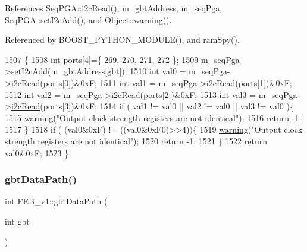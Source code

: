 References Seq\+P\+G\+A\+::i2c\+Read(), m\+\_\+gbt\+Address, m\+\_\+seq\+Pga, Seq\+P\+G\+A\+::set\+I2c\+Add(), and Object\+::warning().



Referenced by B\+O\+O\+S\+T\+\_\+\+P\+Y\+T\+H\+O\+N\+\_\+\+M\+O\+D\+U\+L\+E(), and ram\+Spy().


\begin{DoxyCode}
1507                                    \{
1508   \textcolor{keywordtype}{int} ports[4]=\{ 269, 270, 271, 272 \};
1509   \hyperlink{classFEB__v1_a6c7804ac86796f233a8393043adf2e77}{m\_seqPga}->\hyperlink{classSeqPGA_a4ef334e4d2cb417b49033dce951728cd}{setI2cAdd}(\hyperlink{classFEB__v1_ac625855df976f16694178f1a4c0eef1e}{m\_gbtAddress}[gbt]);
1510   \textcolor{keywordtype}{int} val0 = \hyperlink{classFEB__v1_a6c7804ac86796f233a8393043adf2e77}{m\_seqPga}->\hyperlink{classSeqPGA_a7cd344df2be99f3a02b487f80e87b27e}{i2cRead}(ports[0])&0xF; 
1511   \textcolor{keywordtype}{int} val1 = \hyperlink{classFEB__v1_a6c7804ac86796f233a8393043adf2e77}{m\_seqPga}->\hyperlink{classSeqPGA_a7cd344df2be99f3a02b487f80e87b27e}{i2cRead}(ports[1])&0xF; 
1512   \textcolor{keywordtype}{int} val2 = \hyperlink{classFEB__v1_a6c7804ac86796f233a8393043adf2e77}{m\_seqPga}->\hyperlink{classSeqPGA_a7cd344df2be99f3a02b487f80e87b27e}{i2cRead}(ports[2])&0xF; 
1513   \textcolor{keywordtype}{int} val3 = \hyperlink{classFEB__v1_a6c7804ac86796f233a8393043adf2e77}{m\_seqPga}->\hyperlink{classSeqPGA_a7cd344df2be99f3a02b487f80e87b27e}{i2cRead}(ports[3])&0xF; 
1514   \textcolor{keywordflow}{if} ( val1 != val0 || val2 != val0 || val3 != val0 )\{
1515       \hyperlink{classObject_a65cd4fda577711660821fd2cd5a3b4c9}{warning}(\textcolor{stringliteral}{"Output clock strength registers are not identical"});
1516       \textcolor{keywordflow}{return} -1;
1517   \}
1518   \textcolor{keywordflow}{if} ( (val0&0xF) != ((val0&0xF0)>>4))\{
1519       \hyperlink{classObject_a65cd4fda577711660821fd2cd5a3b4c9}{warning}(\textcolor{stringliteral}{"Output clock strength registers are not identical"});
1520       \textcolor{keywordflow}{return} -1;
1521     \}
1522   \textcolor{keywordflow}{return} val0&0xF;
1523 \}
\end{DoxyCode}
\mbox{\label{classFEB__v1_adf46e43506d1bd7cd26ca62c685e6c98}} 
\subsubsection{\texorpdfstring{gbt\+Data\+Path()}{gbtDataPath()}}
{\footnotesize\ttfamily int F\+E\+B\+\_\+v1\+::gbt\+Data\+Path (\begin{DoxyParamCaption}\item[{int}]{gbt }\end{DoxyParamCaption})}



